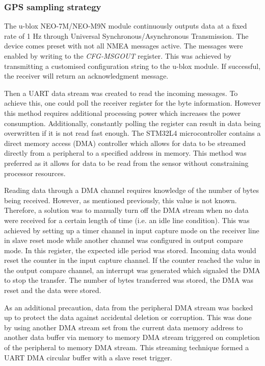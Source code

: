 \subsubsection{GPS sampling strategy}
\label{subsec:CH5_gpsss}

The u-blox NEO-7M/NEO-M9N module continuously outputs data at a fixed rate of 1 Hz \cite{UBLOX_M9N_INTERFACE} through Universal Synchronous/Asynchronous Transmission. The device comes preset with not all NMEA messages active. The messages were enabled by writing to the \textit{CFG-MSGOUT} register. This was achieved by transmitting a customised configuration string to the u-blox module. If successful, the receiver will return an acknowledgment message.\par 

Then a UART data stream was created to read the incoming messages. To achieve this, one could poll the receiver register for the byte information. However this method requires additional processing power which increases the power consumption. Additionally, constantly polling the register can result in data being overwritten if it is not read fast enough. The STM32L4 microcontroller contains a direct memory access (DMA) controller \cite{stm32l4ref} which allows for data to be streamed directly from a peripheral to a specified address in memory. This method was preferred as it allows for data to be read from the sensor without constraining processor resources. \par 

Reading data through a DMA channel requires knowledge of the number of bytes being received. However, as mentioned previously, this value is not known. Therefore, a solution was to manually turn off the DMA stream when no data were received for a certain length of time (i.e. an idle line condition). This was achieved by setting up a timer channel in input capture mode on the receiver line in slave reset mode while another channel was configured in output compare mode. In this register, the expected idle period was stored. Incoming data would reset the counter in the input capture channel. If the counter reached the value in the output compare channel, an interrupt was generated which signaled the DMA to stop the transfer. The number of bytes transferred was stored, the DMA was reset and the data were stored. \par 

As an additional precaution, data from the peripheral DMA stream was backed up to protect the data against accidental deletion or corruption. This was done by using another DMA stream set from the current data memory address to another data buffer via memory to memory DMA stream triggered on completion of the peripheral to memory DMA stream. This streaming technique formed a UART DMA circular buffer with a slave reset trigger.\par 

